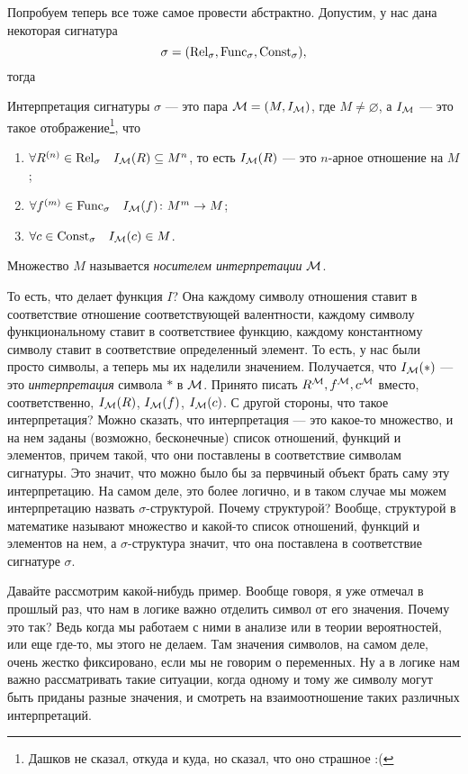 Попробуем теперь все тоже самое провести абстрактно.
Допустим, у нас дана некоторая сигнатура 
$$
    \sigma = (\mathrm{Rel}_{\sigma}, \mathrm{Func}_{\sigma}, \mathrm{Const}_{\sigma}),
$$
тогда
\begin{definition}
    Интерпретация сигнатуры $\sigma$ --- это пара $\mathcal{M} = (M, I_{\mathcal{M}})$, где $M \neq \varnothing$, а $I_{\mathcal{M}}$ --- это такое отображение\footnote{Дашков не сказал, откуда и куда, но сказал, что оно страшное :(}, что
    \begin{enumerate}
        \item $\forall R^{(n)} \in \mathrm{Rel}_{\sigma} \quad I_{\mathcal{M}}(R) \subseteq M^{n}$, то есть $I_{\mathcal{M}}(R)$ --- это $n$-арное отношение на $M$;
        \item $\forall f^{(m)} \in \mathrm{Func}_{\sigma} \quad I_{\mathcal{M}}(f) \colon M^{m} \to M$;
        \item $\forall c \in \mathrm{Const}_{\sigma} \quad I_{\mathcal{M}}(c) \in M$.
    \end{enumerate}
    Множество $M$ называется {\it носителем интерпретации} $\mathcal{M}$.
\end{definition}
То есть, что делает функция $I$?
Она каждому символу отношения ставит в соответствие отношение соответствующей валентности, каждому символу функциональному ставит в соответствиее функцию, каждому константному символу ставит в соответствие определенный элемент.
То есть, у нас были просто символы, а теперь мы их наделили значением.
Получается, что $I_{\mathcal{M}}(*)$ --- это {\it интерпретация} символа $*$ в $\mathcal{M}$.
Принято писать $R^{\mathcal{M}}, f^{\mathcal{M}}, c^{\mathcal{M}}$ вместо, соответственно, $I_{\mathcal{M}}(R)$, $I_{\mathcal{M}}(f)$, $I_{\mathcal{M}}(c)$.
С другой стороны, что такое интерпретация?
Можно сказать, что интерпретация --- это какое-то множество, и на нем заданы (возможно, бесконечные) список отношений, функций и элементов, причем такой, что они поставлены в соответствие символам сигнатуры.
Это значит, что можно было бы за первчиный объект брать саму эту интерпретацию.
На самом деле, это более логично, и в таком случае мы можем интерпретацию назвать $\sigma$-структурой.
Почему структурой?
Вообще, структурой в математике называют множество и какой-то список отношений, функций и элементов на нем, а $\sigma$-структура значит, что она поставлена в соответствие сигнатуре $\sigma$.

Давайте рассмотрим какой-нибудь пример.
Вообще говоря, я уже отмечал в прошлый раз, что нам в логике важно отделить символ от его значения.
Почему это так?
Ведь когда мы работаем с ними в анализе или в теории вероятностей, или еще где-то, мы этого не делаем.
Там значения символов, на самом деле, очень жестко фиксировано, если мы не говорим о переменных.
Ну а в логике нам важно рассматривать такие ситуации, когда одному и тому же символу могут быть приданы разные значения, и смотреть на взаимоотношение таких различных интерпретаций.


